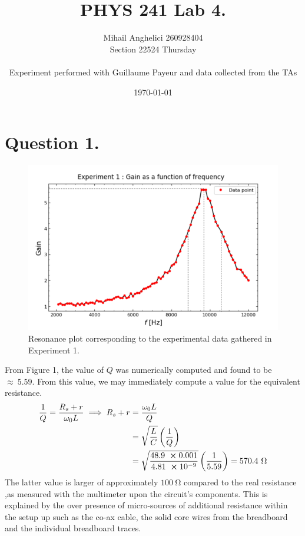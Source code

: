 \documentclass[
	12pt,
	]{article}
\title{PHYS 241 Lab 4.}
\author{Mihail Anghelici 260928404 \\ Section  22524 Thursday\\ \\ Experiment performed with Guillaume Payeur and data collected from the TAs}
\date{\today}
\theoremstyle{definition}
\theoremstyle{definition}
\theoremstyle{definition}
\theoremstyle{definition}
\theoremstyle{definition}
\theoremstyle{example}
\theoremstyle{note}
\theoremstyle{remark}
\theoremstyle{example}
\begin{document}
	\maketitle
		\section*{Question 1.}
		\vspace{-1cm}
			\begin{figure}[H]
				\centering
				\includegraphics[width=0.7\linewidth]{PHYS241_Lab4_Exp1.png}
				\captionsetup{margin=1cm}
				\caption{Resonance plot corresponding to the experimental data gathered in Experiment 1.}
			\end{figure}
			From Figure 1, the value of $Q$ was numerically computed and found to be $\approx \ 5.59$. From this value, we may immediately compute a value for the equivalent resistance.
			\begin{align*}
				\frac{1}{Q} = \frac{R_s + r}{\omega_{0}L} \implies R_s + r &= \frac{\omega_{0}L}{Q} \\
				&= \sqrt{\frac{L}{C}}\left(\frac{1}{Q}\right)\\
				&= \sqrt{\frac{48.9 \ \cross 0.001}{4.81 \ \cross 10^{-9}}}\left(\frac{1}{5.59}\right) = 570.4 \ \si{\ohm}
			\end{align*}
			The latter value is larger of approximately $100 \ \si{\ohm}$ compared to the real resistance ,as measured with the multimeter upon the circuit's components. This is explained by the over presence of micro-sources of additional resistance within the setup up such as the co-ax cable, the solid core wires from the breadboard and the individual breadboard traces.
			
\end{document}
